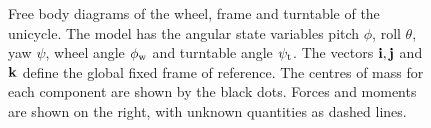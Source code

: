 \begin{figure}
\centering
{}
\caption{Free body diagrams of the wheel, frame and turntable of the unicycle. The model has the angular state variables pitch $\phi$, roll $\theta$, yaw $\psi$, wheel angle $\phi_{\text{w}}$ and turntable angle $\psi_{\text{t}}$. The vectors $\mathbf{i}, \mathbf{j}$ and $\mathbf{k}$ define the global fixed frame of reference. The centres of mass for each component are shown by the black dots. Forces and moments are shown on the right, with unknown quantities as dashed lines.}
\label{fig:FBDs}
\end{figure}







